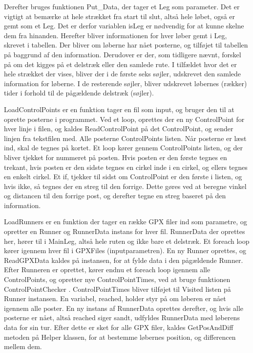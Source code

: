 Derefter bruges funktionen Put\_Data, der tager et Leg som parameter. Det er vigtigt at bemærke at hele strækket fra start til slut, altså hele løbet, også er gemt som et Leg. Det er derfor variablen isLeg er nødvendig for at kunne skelne dem fra hinanden. Herefter bliver informationen for hver løber gemt i Leg, skrevet i tabellen. Der bliver om løberne har nået posterne, og tilføjet til tabellen på baggrund af den information. Derudover er der, som tidligere nævnt, forskel på om det kigges på et delstræk eller den samlede rute. I tilfældet hvor det er hele strækket der vises, bliver der i de første seks søjler, udskrevet den samlede information for løberne. I de resterende søjler, bliver udskrevet løbernes (rækker) tider i forhold til de pågældende delstræk (søjler).

LoadControlPoints er en funktion  tager en fil som input, og bruger den til at oprette posterne i programmet. Ved et loop, oprettes der en ny ControlPoint for hver linje i filen, og kaldes ReadControlPoint på det ControlPoint, og sender linjen fra tekstfilen med. Alle posterne ControlPoints listen.
Når posterne er læst ind, skal de tegnes på kortet. Et loop kører gennem ControlPoints listen, og der bliver tjekket for nummeret på posten. Hvis posten er den første tegnes en trekant, hvis posten er den sidste tegnes en cirkel inde i en cirkel, og ellers tegnes en enkelt cirkel. 
Et if, tjekker til sidst om ControlPoint er den første i listen, og hvis ikke, så tegnes der en streg til den forrige. Dette gøres ved at beregne vinkel og distancen til den forrige post, og derefter tegne en streg baseret på den information. 

LoadRunners  er en funktion der tager en række GPX filer ind som parametre, og opretter en Runner og RunnerData instans for hver fil. RunnerData der oprettes her, hører til i MainLeg, altså hele ruten og ikke bare et delstræk. 
Et foreach loop kører igennem hver fil i GPXFiles (inputparametren). En ny Runner oprettes, og ReadGPXData kaldes på instansen, for at fylde data i den pågældende Runner. Efter Runneren er oprettet,  kører endnu et foreach loop igennem alle ControlPoints, og opretter nye ControlPointTimes, ved at bruge funktionen ControlPointChecker . ControlPointTimes bliver tilføjet til Visited listen på Runner instansen.  En variabel, reached, holder styr på om løberen er nået igennem alle poster. 
En ny instans af RunnerData oprettes derefter, og hvis alle posterne er nået, altså reached siger sandt, udfyldes RunnerData med løberens data for sin tur. 
Efter dette er sket for alle GPX filer, kaldes GetPosAndDiff  metoden på Helper klassen, for at bestemme løbernes position, og differencen mellem dem. 

